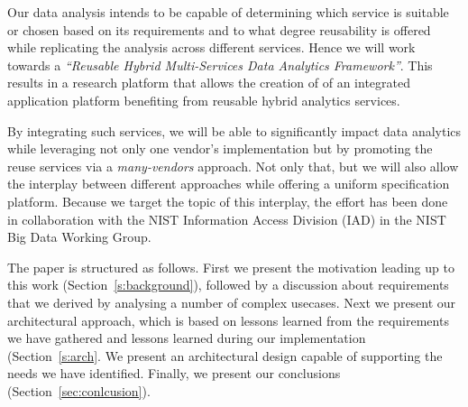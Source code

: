 Our data analysis intends to be capable of determining which service is
suitable or chosen based on its requirements and to what degree
reusability is offered while replicating the analysis across different
services. Hence we will work towards a {\em ``Reusable Hybrid
Multi-Services Data Analytics Framework''}. This results in a research
platform that allows the creation of of an integrated application
platform benefiting from reusable hybrid analytics services.


By integrating such services, we will be able to significantly impact
data analytics while leveraging not only one vendor's implementation
but by promoting the reuse services via a {\em many-vendors}
approach. Not only that, but we will also allow the interplay between
different approaches while offering a uniform specification platform.
Because we target the topic of this interplay, the effort has been
done in collaboration with the NIST Information Access Division (IAD)
in the NIST Big Data Working Group.

The paper is structured as follows. First we present the motivation
leading up to this work (Section~\ref{s:background}), followed by a
discussion about requirements that we derived by analysing a number of
complex usecases. Next we present our architectural approach, which is
based on lessons learned from the requirements we have gathered and
lessons learned during our implementation (Section~\ref{s:arch}. We
present an architectural design capable of supporting the needs we
have identified.  Finally, we present our conclusions
(Section~\ref{sec:conlcusion}).
